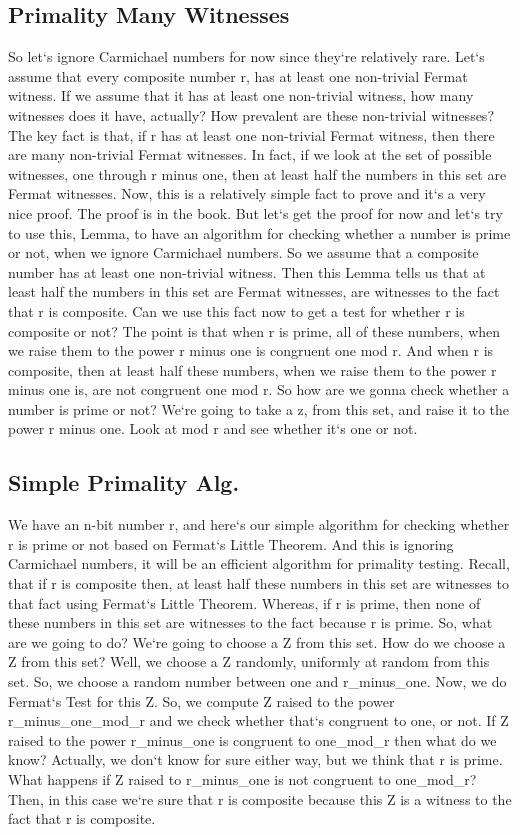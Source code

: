 \subsection{Primality  Many Witnesses}
So let`s ignore Carmichael numbers for now since they`re relatively rare.
Let`s assume that every composite number r, has at least one non-trivial Fermat witness.
If we assume that it has at least one non-trivial witness, how many witnesses does it have, actually? How prevalent are these non-trivial witnesses? The key fact is that, if r has at least one non-trivial Fermat witness, then there are many non-trivial Fermat witnesses.
In fact, if we look at the set of possible witnesses, one through r minus one, then at least half the numbers in this set are Fermat witnesses.
Now, this is a relatively simple fact to prove and it`s a very nice proof.
The proof is in the book.
But let`s get the proof for now and let`s try to use this, Lemma, to have an algorithm for checking whether a number is prime or not, when we ignore Carmichael numbers.
So we assume that a composite number has at least one non-trivial witness.
Then this Lemma tells us that at least half the numbers in this set are Fermat witnesses, are witnesses to the fact that r is composite.
Can we use this fact now to get a test for whether r is composite or not? The point is that when r is prime, all of these numbers, when we raise them to the power r minus one is congruent one mod r.
And when r is composite, then at least half these numbers, when we raise them to the power r minus one is, are not congruent one mod r.
So how are we gonna check whether a number is prime or not? We`re going to take a z, from this set, and raise it to the power r minus one.
Look at mod r and see whether it`s one or not.

\subsection{Simple Primality Alg.}
We have an n-bit number r, and here`s our simple algorithm for checking whether r is prime or not based on Fermat`s Little Theorem.
And this is ignoring Carmichael numbers, it will be an efficient algorithm for primality testing.
Recall, that if r is composite then, at least half these numbers in this set are witnesses to that fact using Fermat`s Little Theorem.
Whereas, if r is prime, then none of these numbers in this set are witnesses to the fact because r is prime.
So, what are we going to do? We`re going to choose a Z from this set.
How do we choose a Z from this set? Well, we choose a Z randomly, uniformly at random from this set.
So, we choose a random number between one and r\_minus\_one.
Now, we do Fermat`s Test for this Z\@.
So, we compute Z raised to the power r\_minus\_one\_mod\_r and we check whether that`s congruent to one, or not.
If Z raised to the power r\_minus\_one is congruent to one\_mod\_r then what do we know? Actually, we don`t know for sure either way, but we think that r is prime.
What happens if Z raised to r\_minus\_one is not congruent to one\_mod\_r? Then, in this case we`re sure that r is composite because this Z is a witness to the fact that r is composite.

